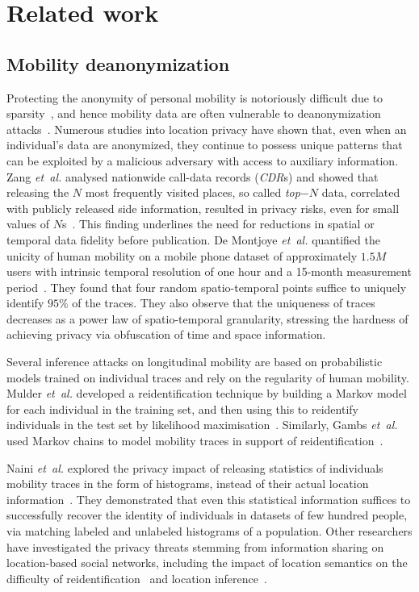 \section{Related work}


\subsection{Mobility deanonymization}

Protecting the anonymity of personal mobility is notoriously difficult due to sparsity~\citep{aggarwal2008}, and hence mobility data are often vulnerable to deanonymization attacks~\citep{Narayanan2008}.
Numerous studies into location privacy have shown that, even when an individual's data are anonymized, they continue to possess unique patterns that can be exploited by a malicious adversary with access to auxiliary information.
Zang \emph{et~al.} analysed nationwide call-data records (\emph{CDR}s) and showed that releasing the $N$ most frequently visited places, so called \emph{top$-N$} data, correlated with publicly released side information, resulted in privacy risks, even for small values of $N$s~\citep{Zang2011}.
This finding underlines the need for reductions in spatial or temporal data fidelity before publication.
De Montjoye \emph{et~al.} quantified the unicity of human mobility on a mobile phone dataset of approximately $1.5M$ users with intrinsic temporal resolution of one hour and a 15-month measurement period~\citep{DeMontjoye2013}.
They found that four random spatio-temporal points suffice to uniquely identify $ 95\% $ of the traces.
They also observe that the uniqueness of traces decreases as a power law of spatio-temporal granularity, stressing the hardness of achieving privacy via obfuscation of time and space information.

Several inference attacks on longitudinal mobility are based on probabilistic models trained on individual traces and rely on the regularity of human mobility.
Mulder \emph{et~al.} developed a reidentification technique by building a Markov model for each individual in the training set, and then using this to reidentify individuals in the test set by likelihood maximisation~\cite{deMulder08}.
Similarly, Gambs \emph{et~al.} used Markov chains to model mobility traces in support of reidentification~\cite{Gambs2014}.

Naini \emph{et~al.} explored the privacy impact of releasing statistics of individuals mobility traces in the form of histograms, instead of their actual location information~\cite{Naini2016a}. They demonstrated that even this statistical information suffices to successfully recover the identity of individuals in datasets of few hundred people, via matching labeled and unlabeled histograms of a population.
Other researchers have investigated the privacy threats stemming from information sharing on location-based social networks, including the impact of location semantics on the difficulty of reidentification~\cite{privacyAndTheCity} and location inference~\cite{Agir}.

